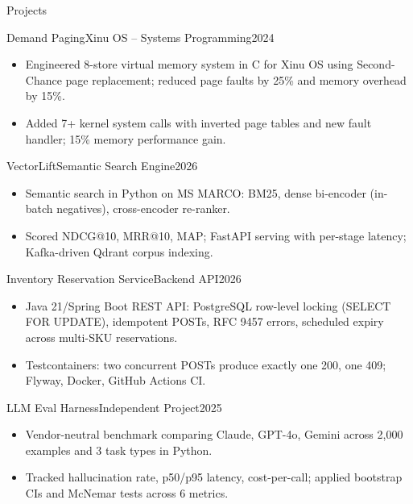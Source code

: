 \documentclass[]{mcdowellcv}
\begin{document}
\begin{cvsection}{Projects}
  \begin{cvsubsection}{Demand Paging}{Xinu OS -- Systems Programming}{2024}
    \begin{itemize}
      \item Engineered 8-store virtual memory system in C for Xinu OS using Second-Chance page replacement; reduced page faults by 25\% and memory overhead by 15\%.
      \item Added 7+ kernel system calls with inverted page tables and new fault handler; 15\% memory performance gain.
    \end{itemize}
    \vspace{-1.5pt}
  \end{cvsubsection}

  \begin{cvsubsection}{VectorLift}{Semantic Search Engine}{2026}
    \begin{itemize}
      \item Semantic search in Python on MS MARCO: BM25, dense bi-encoder (in-batch negatives), cross-encoder re-ranker.
      \item Scored NDCG@10, MRR@10, MAP; FastAPI serving with per-stage latency; Kafka-driven Qdrant corpus indexing.
    \end{itemize}
    \vspace{-1.5pt}
  \end{cvsubsection}

  \begin{cvsubsection}{Inventory Reservation Service}{Backend API}{2026}
    \begin{itemize}
      \item Java 21/Spring Boot REST API: PostgreSQL row-level locking (SELECT FOR UPDATE), idempotent POSTs, RFC 9457 errors, scheduled expiry across multi-SKU reservations.
      \item Testcontainers: two concurrent POSTs produce exactly one 200, one 409; Flyway, Docker, GitHub Actions CI.
    \end{itemize}
    \vspace{-1.5pt}
  \end{cvsubsection}

  \begin{cvsubsection}{LLM Eval Harness}{Independent Project}{2025}
    \begin{itemize}
      \item Vendor-neutral benchmark comparing Claude, GPT-4o, Gemini across 2,000 examples and 3 task types in Python.
      \item Tracked hallucination rate, p50/p95 latency, cost-per-call; applied bootstrap CIs and McNemar tests across 6 metrics.
    \end{itemize}
  \end{cvsubsection}
\end{cvsection}
\end{document}
